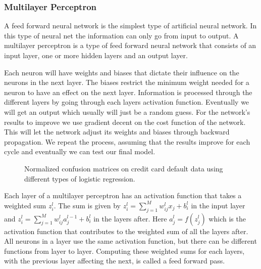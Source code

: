\documentclass[%
 reprint,
nofootinbib,
 amsmath,amssymb,
 aps,
]{revtex4-2}
\begin{document}
\subsubsection{Multilayer Perceptron}
A feed forward neural network is the simplest type of artificial neural network. In this type of neural net the information can only go from input to output. A multilayer perceptron is a type of feed forward neural network that consists of an input layer, one or more hidden layers and an output layer.

Each neuron will have weights and biases that dictate their influence on the neurons in the next layer. The biases restrict the minimum weight needed for a neuron to have an effect on the next layer. Information is processed through the different layers by going through each layers activation function. Eventually we will get an output which usually will just be a random guess. For the network's results to improve we use gradient decent on the cost function of the network. This will let the network adjust its weights and biases through backward propagation. We repeat the process, assuming that the results improve for each cycle and eventually we can test our final model.

\begin{figure}[h!]
\caption{Normalized confusion matrices on credit card default data using different types of logistic regression.}
\label{fig:conf_matrices_logreg}
\end{figure}

Each layer of a multilayer perceptron has an activation function that takes a weighted sum $z_i^l$. The sum is given by $z_i^l = \sum_{j=1}^{M} w_ {ij}^l x_j + b_i^l$ in the input layer and $z_i^l = \sum_{j=1}^{M} w_ {ij}^l a_j^{l-1} + b_i^l$ in the layers after. Here $a_j^l = f(z_j^l)$ which is the activation function that contributes to the weighted sum of all the layers after. All neurons in a layer use the same activation function, but there can be different functions from layer to layer. Computing these weighted sums for each layers, with the previous layer affecting the next, is called a feed forward pass.
\end{document}
